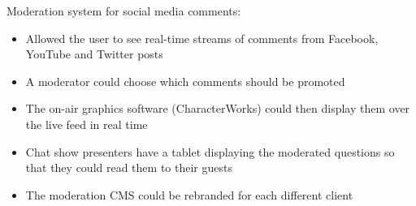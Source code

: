\item Moderation system for social media comments:
\begin{itemize}
    \item Allowed the user to see real-time streams of comments from Facebook, YouTube and Twitter posts
    \item A moderator could choose which comments should be promoted
    \item The on-air graphics software (CharacterWorks) could then display them over the live feed in real time
    \item Chat show presenters have a tablet displaying the moderated questions so that they could read them to their guests
    \item The moderation CMS could be rebranded for each different client
\end{itemize}

